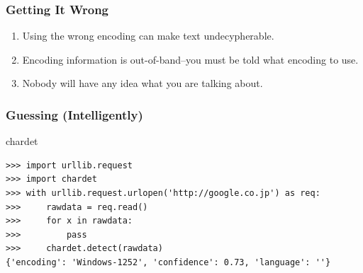 \documentclass[smaller,xcolor=table,aspectratio=169]{beamer}
\newcommand\Vtextvisiblespace[1][.3em]{%
  \mbox{\kern.06em\vrule height.3ex}%
  \vbox{\hrule width#1}%
  \hbox{\vrule height.3ex}}
\begin{document}
						\begin{frame}
							\frametitle{Getting It Wrong}
							\begin{enumerate}
								\item Using the wrong encoding can make text undecypherable.
								\item Encoding information is out-of-band--you must be told what encoding to use.
								\item Nobody will have any idea what you are talking about.
							\end{enumerate}

						\end{frame}

						\lstset{language=Python}

						\begin{frame}[fragile]
							\frametitle{Guessing (Intelligently)}
							chardet
							\begin{lstlisting}[style=mystyle]
>>> import urllib.request
>>> import chardet
>>> with urllib.request.urlopen('http://google.co.jp') as req:
>>>     rawdata = req.read()
>>>     for x in rawdata:
>>>         pass
>>>     chardet.detect(rawdata)
{'encoding': 'Windows-1252', 'confidence': 0.73, 'language': ''}
							\end{lstlisting}

						\end{frame}
\end{document}
